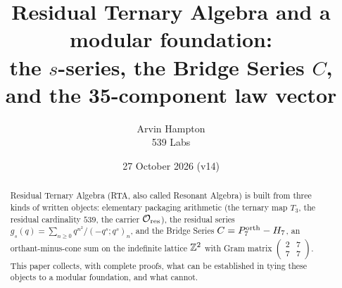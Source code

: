 \title{Residual Ternary Algebra and a modular foundation:\\ the $s$-series, the Bridge Series $C$, and the 35-component law vector}
\author{Arvin Hampton\\ \small 539 Labs}
\date{27 October 2026 (v14)}

\maketitle
\begin{abstract}
Residual Ternary Algebra (RTA, also called Resonant Algebra) is built from three kinds of written objects: elementary packaging arithmetic
(the ternary map $T_3$, the residual cardinality $539$, the carrier $\mathcal O_{\rm res}$), the residual series
$g_s(q)=\sum_{n\ge0}q^{n^2}/(-q^s;q^s)_n$, and the Bridge Series $C=P^{\mathrm{orth}}_7-H_7$, an orthant-minus-cone sum on the indefinite lattice
$\mathbb{Z}^2$ with Gram matrix $\left(\begin{smallmatrix}2&7\\7&7\end{smallmatrix}\right)$. This paper collects, with complete proofs, what can be
established in tying these objects to a modular foundation, and what cannot.


\end{abstract}
